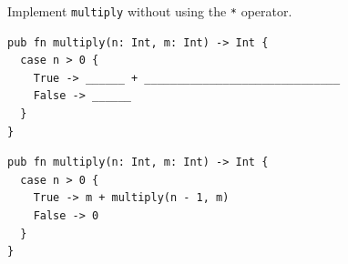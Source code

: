 \begin{blocksection}
\question Implement \texttt{multiply} without using the \texttt{*} operator.
\newline
\begin{lstlisting}
pub fn multiply(n: Int, m: Int) -> Int {
  case n > 0 {
    True -> ______ + ______________________________
    False -> ______
  }
}
\end{lstlisting}
\begin{solution}
\begin{lstlisting}
pub fn multiply(n: Int, m: Int) -> Int {
  case n > 0 {
    True -> m + multiply(n - 1, m)
    False -> 0
  }
}
\end{lstlisting}
\end{solution}
\end{blocksection}